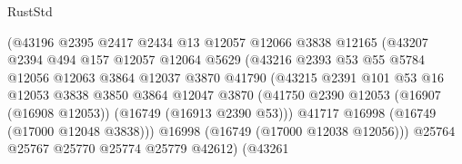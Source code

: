 \begin{lexlean}{RustStd}
\begin{coremodule}
                                  (@43196
                                    @2395
                                    @2417
                                    @2434
                                    @13
                                    @12057
                                    @12066
                                    @3838
                                    @12165
                                    (@43207
                                      @2394
                                      @494
                                      @157
                                      @12057
                                      @12064
                                      @5629
                                      (@43216
                                        @2393
                                        @53
                                        @55
                                        @5784
                                        @12056
                                        @12063
                                        @3864
                                        @12037
                                        @3870
                                        @41790
                                        (@43215
                                          @2391
                                          @101
                                          @53
                                          @16
                                          @12053
                                          @3838
                                          @3850
                                          @3864
                                          @12047
                                          @3870
                                          (@41750
                                            @2390
                                            @12053
                                            (@16907 (@16908 @12053))
                                            (@16749 (@16913 @2390 @53)))
                                          @41717
                                          @16998
                                          (@16749 (@17000 @12048 @3838)))
                                        @16998
                                        (@16749 (@17000 @12038 @12056)))
                                      @25764
                                      @25767
                                      @25770
                                      @25774
                                      @25779
                                      @42612)
                                    (@43261

\end{coremodule}
\end{lexlean}

